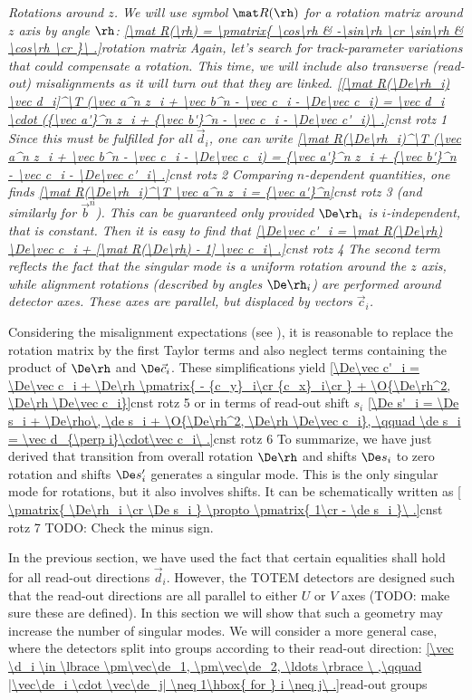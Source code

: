 \em{Rotations around $z$}. We will use symbol $\mat R(\rh)$ for a rotation matrix around $z$ axis by angle $\rh$:
\eqref{\mat R(\rh) = \pmatrix{
\cos\rh & -\sin\rh \cr
\sin\rh & \cos\rh \cr
}\ .}{rotation matrix}
Again, let's search for track-parameter variations that could compensate a rotation. This time, we will include also transverse (read-out) misalignments as it will turn out that they are linked.
\eqref{[\mat R(\De\rh_i) \vec d_i]^\T (\vec a^n z_i + \vec b^n - \vec c_i - \De\vec c_i) = \vec d_i \cdot ({\vec a'}^n z_i + {\vec b'}^n - \vec c_i - \De\vec c'_i)\ .}{cnst rotz 1}
Since this must be fulfilled for all $\vec d_i$, one can write
\eqref{\mat R(\De\rh_i)^\T (\vec a^n z_i + \vec b^n - \vec c_i - \De\vec c_i) = {\vec a'}^n z_i + {\vec b'}^n - \vec c_i - \De\vec c'_i\ .}{cnst rotz 2}
Comparing $n$-dependent quantities, one finds
\eqref{\mat R(\De\rh_i)^\T \vec a^n z_i = {\vec a'}^n}{cnst rotz 3}
(and similarly for $\vec b^n$). This can be guaranteed only provided $\De\rh_i$ is $i$-independent, that is constant. Then it is easy to find that
\eqref{\De\vec c'_i = \mat R(\De\rh) \De\vec c_i + [\mat R(\De\rh) - 1] \vec c_i\ .}{cnst rotz 4}
The second term reflects the fact that the singular mode is a uniform rotation around the $z$ axis, while alignment rotations (described by angles $\De\rh_i$) are performed around detector axes. These axes are parallel, but displaced by vectors $\vec c_i$.

Considering the misalignment expectations (see ), it is reasonable to replace the rotation matrix by the first Taylor terms and also neglect terms containing the product of $\De\rh$ and $\De\vec c_i$. These simplifications yield
\eqref{\De\vec c'_i = \De\vec c_i + \De\rh \pmatrix{
- {c_y}_i\cr
{c_x}_i\cr
} + \O{\De\rh^2, \De\rh \De\vec c_i}}{cnst rotz 5}
or in terms of read-out shift $s_i$
\eqref{\De s'_i = \De s_i + \De\rho\, \de s_i + \O{\De\rh^2, \De\rh \De\vec c_i}, \qquad \de s_i = \vec d_{\perp i}\cdot\vec c_i\ .}{cnst rotz 6}
To summarize, we have just derived that transition from overall rotation $\De\rh$ and shifts $\De s_i$ to zero rotation and shifts $\De s_i'$ generates a singular mode. This is the only singular mode for rotations, but it also involves shifts. It can be schematically written as
\eqref{
\pmatrix{
\De\rh_i \cr
\De s_i
} \propto \pmatrix{
1\cr
- \de s_i
}\ .}{cnst rotz 7}
TODO: Check the minus sign.



In the previous section, we have used the fact that certain equalities shall hold for all read-out directions $\vec d_i$. However, the TOTEM detectors are designed such that the read-out directions are all parallel to either $U$ or $V$ axes (TODO: make sure these are defined). In this section we will show that such a geometry may increase the number of singular modes. We will consider a more general case, where the detectors split into groups according to their read-out direction:
\eqref{\vec \d_i \in \lbrace \pm\vec\de_1, \pm\vec\de_2, \ldots \rbrace \ ,\qquad |\vec\de_i \cdot \vec\de_j| \neq 1\hbox{ for } i \neq j\ .}{read-out groups}


